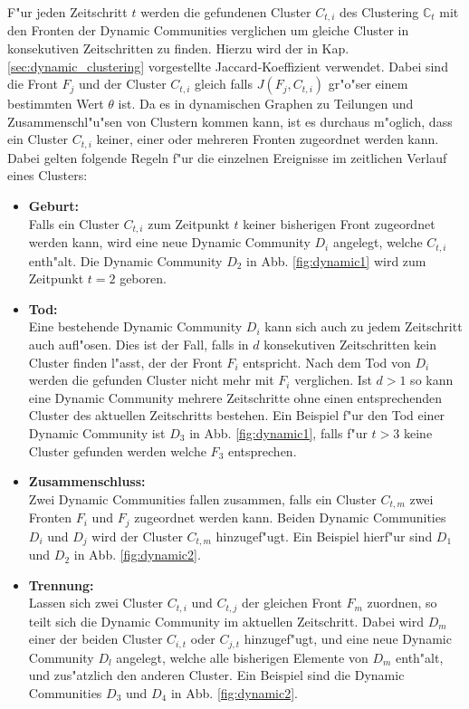 \documentclass[journal]{vgtc}
\begin{document}
    F"ur jeden Zeitschritt $t$ werden die gefundenen Cluster $C_{t,i}$ des Clustering $\mathbb{C}_t$ mit den Fronten der Dynamic Communities
    verglichen um gleiche Cluster in konsekutiven Zeitschritten zu finden. Hierzu wird der in Kap. \ref{sec:dynamic_clustering}
    vorgestellte Jaccard-Koeffizient verwendet. Dabei sind die
    Front $F_j$ und der Cluster $C_{t,i}$ gleich falls $J(F_j,C_{t,i})$ gr"o"ser einem bestimmten Wert $\theta$ ist. Da es in dynamischen Graphen
    zu Teilungen und Zusammenschl"u"sen von Clustern kommen kann, ist es durchaus m"oglich, dass ein Cluster $C_{t,i}$ keiner, einer oder mehreren 
    Fronten zugeordnet werden kann. Dabei gelten folgende Regeln f"ur die einzelnen Ereignisse im zeitlichen Verlauf eines Clusters:
    \begin{itemize}
      \item \textbf{Geburt:} \hfill \\
	    Falls ein Cluster $C_{t,i}$ zum Zeitpunkt $t$ keiner bisherigen Front zugeordnet werden kann, wird eine neue Dynamic Community
	    $D_i$ angelegt, welche $C_{t,i}$ enth"alt. Die Dynamic Community $D_2$ in Abb. \ref{fig:dynamic1} wird zum Zeitpunkt $t=2$ geboren. 
      \item \textbf{Tod:} \hfill \\
	    Eine bestehende Dynamic Community $D_i$ kann sich auch zu jedem Zeitschritt auch aufl"osen. Dies ist der Fall, falls in $d$ konsekutiven
	    Zeitschritten kein Cluster finden l"asst, der der Front $F_i$ entspricht. Nach dem Tod von $D_i$ werden die gefunden Cluster nicht mehr mit
	    $F_i$ verglichen. Ist $d>1$ so kann eine Dynamic Community mehrere Zeitschritte ohne einen entsprechenden Cluster des aktuellen Zeitschritts bestehen.
	    Ein Beispiel f"ur den Tod einer Dynamic Community ist $D_3$ in Abb. \ref{fig:dynamic1}, falls f"ur $t>3$ keine Cluster gefunden werden welche $F_3$ entsprechen.
      \item \textbf{Zusammenschluss:} \hfill \\
	    Zwei Dynamic Communities fallen zusammen, falls ein Cluster $C_{t,m}$ zwei Fronten $F_i$ und $F_j$ zugeordnet werden kann. Beiden Dynamic Communities
	    $D_i$ und $D_j$ wird der Cluster $C_{t,m}$ hinzugef"ugt. Ein Beispiel hierf"ur sind $D_1$ und $D_2$ in Abb. \ref{fig:dynamic2}.
      \item \textbf{Trennung:} \hfill \\
	    Lassen sich zwei Cluster $C_{t,i}$ und $C_{t,j}$ der gleichen Front $F_m$ zuordnen, so teilt sich die Dynamic Community im aktuellen Zeitschritt.
	    Dabei wird $D_m$ einer der beiden Cluster $C_{i,t}$ oder $C_{j,t}$ hinzugef"ugt, und eine neue Dynamic Community $D_l$ angelegt, welche alle bisherigen
	    Elemente von $D_m$ enth"alt, und zus"atzlich den anderen Cluster.
	    Ein Beispiel sind die Dynamic Communities $D_3$ und $D_4$ in Abb. \ref{fig:dynamic2}.
    \end{itemize}
\end{document}
